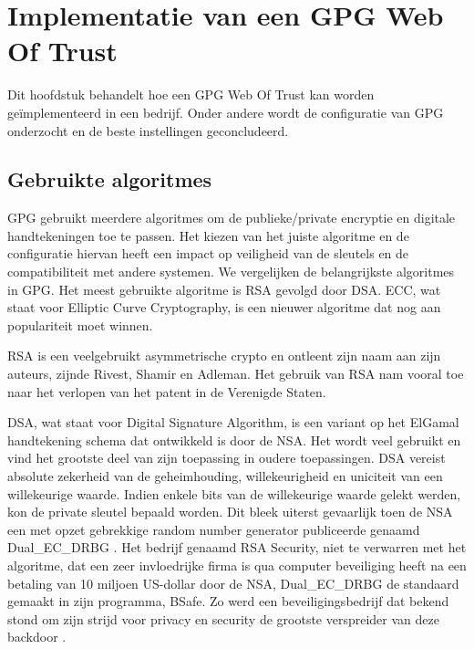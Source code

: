 \chapter{Implementatie van een GPG Web Of Trust}
\label{ch:implementatie-van-een-gpg-web-of-trust}

Dit hoofdstuk behandelt hoe een GPG Web Of Trust kan worden geïmplementeerd in
een bedrijf. Onder andere wordt de configuratie van GPG onderzocht en de beste
instellingen geconcludeerd.

\section{Gebruikte algoritmes}
\label{sec:gebruikte-algoritmes}

GPG gebruikt meerdere algoritmes om de publieke/private encryptie en digitale
handtekeningen toe te passen. Het kiezen van het juiste algoritme en de
configuratie hiervan heeft een impact op veiligheid van de sleutels en de
compatibiliteit met andere systemen. We vergelijken de belangrijkste algoritmes
in GPG. Het meest gebruikte algoritme is RSA gevolgd door DSA. ECC, wat staat
voor Elliptic Curve Cryptography, is een nieuwer algoritme dat nog aan
populariteit moet winnen.

RSA is een veelgebruikt asymmetrische crypto en ontleent zijn naam aan zijn
auteurs, zijnde Rivest, Shamir en Adleman. Het gebruik van RSA nam vooral toe
naar het verlopen van het patent in de Verenigde Staten.

DSA, wat staat voor Digital Signature Algorithm, is een variant op het ElGamal
handtekening schema dat ontwikkeld is door de NSA. Het wordt veel gebruikt en
vind het grootste deel van zijn toepassing in oudere toepassingen. DSA vereist
absolute zekerheid van de geheimhouding, willekeurigheid en uniciteit van een
willekeurige waarde. Indien enkele bits van de willekeurige waarde gelekt
werden, kon de private sleutel bepaald worden. Dit bleek uiterst gevaarlijk toen
de NSA een met opzet gebrekkige random number generator publiceerde genaamd
Dual\_EC\_DRBG \autocite{Perlroth2013NsaRng, Zetter2013NsaRng, GuardianNsaRng}.
Het bedrijf genaamd RSA Security, niet te verwarren met het algoritme, dat een
zeer invloedrijke firma is qua computer beveiliging heeft na een betaling van 10
miljoen US-dollar door de NSA, Dual\_EC\_DRBG de standaard gemaakt in zijn
programma, BSafe. Zo werd een beveiligingsbedrijf dat bekend stond om zijn
strijd voor privacy en security de grootste verspreider van deze backdoor
\autocite{Menn2013NsaRsa}.

